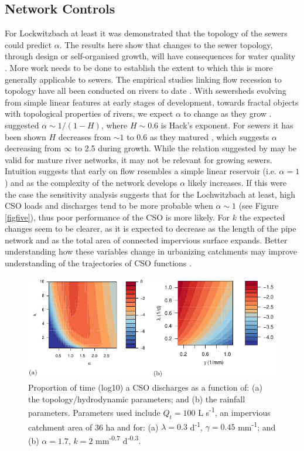 \documentclass[draft,linenumbers]{agujournal2018}
\begin{document}
\subsection{Network Controls}
For Lockwitzbach at least it was demonstrated that the topology of the sewers could predict $\alpha$. The results here show that changes to the sewer topology, through design or self-organised growth, will have consequences for water quality \citep{Yang_2017}. More work needs to be done to establish the extent to which this is more generally applicable to sewers.  The empirical studies linking f\/low recession to topology have all been conducted on rivers to date \citep{Biswal_2014}. With sewersheds evolving from simple linear features at early stages of development, towards fractal objects with topological properties of rivers, we expect $\alpha$ to change as they grow \citep{Yang_2017}. \citet{Biswal_2014} suggested $\alpha \sim 1/(1-H)$, where $H \sim 0.6$ is Hack’s exponent. For sewers it has been shown $H$ decreases from $\sim 1$ to 0.6 as they matured \citep{Yang_2017}, which suggests $\alpha$ decreasing from $\infty$ to 2.5 during growth. While the relation suggested by \citet{Biswal_2010} may be valid for mature river networks, it may not be relevant for growing sewers. Intuition suggests that early on f\/low resembles a simple linear reservoir (i.e. $\alpha = 1$) and as the complexity of the network develops $\alpha$ likely increases. If this were the case the sensitivity analysis suggests that for the Lochwitzbach at least, high CSO loads and discharges tend to be more probable when $\alpha \sim 1$ (see Figure \ref{figfive}), thus poor performance of the CSO is more likely. For $k$ the expected changes seem to be clearer, as it is expected to decrease as the length of the pipe network and as the total area of connected impervious surface expands. Better understanding how these variables change in urbanizing catchments may improve understanding of the trajectories of CSO functions \citep{Semadeni_Davies_2008}. 

\begin{figure}[ht]
 \centering
 \includegraphics[width=30pc]{CSO_Frequency_Combined.pdf}
 \caption{Proportion of time (log10) a CSO discharges as a function of: (a) the topology/hydrodynamic parameters; and (b) the rainfall parameters. Parameters used include $Q_t = 100$ L s\textsuperscript{-1}, an impervious catchment area of 36 ha and for: (a) $\lambda = 0.3$ d\textsuperscript{-1}, $\gamma = 0.45$ mm\textsuperscript{-1}; and (b) $\alpha = 1.7$, $k = 2$  mm\textsuperscript{-0.7} d\textsuperscript{-0.3}.}
 \label{figeight}
 \end{figure}
 
\end{document}
